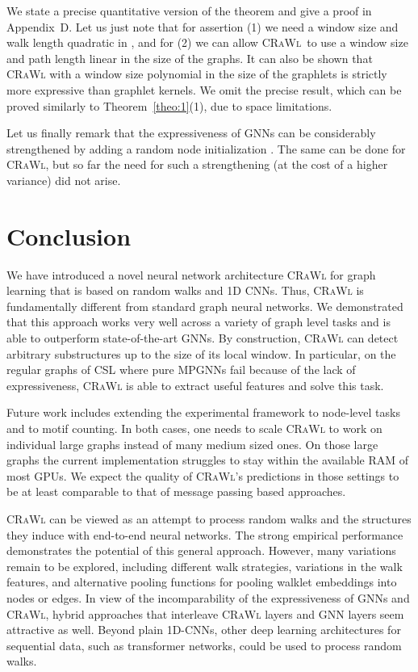 \documentclass{scrartcl} \usepackage[dvipsnames]{xcolor}
\newcommand{\crawl}{\textsc{CRaWl}}
\begin{document}
We state a precise quantitative version of the theorem and give a
proof in Appendix~D. Let us just note that for
{assertion (1)} we need a window size  and walk length 
quadratic in , and for (2) we can allow \crawl\ to use a window
size and path length linear in the size of the graphs.
It can also be shown that
\crawl{} with a window size polynomial in the size of the graphlets is strictly more expressive than graphlet kernels. We omit the precise result, which can be proved similarly to Theorem~\ref{theo:1}(1), due to space
limitations.


Let us finally remark that the expressiveness of GNNs can be
considerably strengthened by adding a random node initialization
\cite{abbceygroluk20,SatoRandom2020}. The same can be done for \crawl{},
but so far the need for such a strengthening (at the cost of a higher
variance) did not arise.



     \section{Conclusion}
\label{conclusion}

We have introduced a novel neural network architecture \crawl{} for graph learning that is based on random walks and 1D CNNs.
Thus, \crawl{} is fundamentally different from standard graph neural networks.
We demonstrated that this approach works very well across a variety of graph level tasks and is able to outperform state-of-the-art GNNs.
By construction, \crawl{} can detect arbitrary substructures up to the size of its local window.
In particular, on the regular graphs of CSL where pure MPGNNs fail because of the lack of expressiveness, \crawl{} is able to extract useful features and solve this task.


Future work includes extending the experimental framework to node-level tasks and to motif counting. 
In both cases, one needs to scale \crawl{} to work on individual large graphs instead of many medium sized ones.
On those large graphs the current implementation struggles to stay within the available RAM of most GPUs.
We expect the quality of \crawl{}'s predictions in those settings to be at least comparable to that of message passing based approaches.




\crawl{} can be viewed as an attempt
to process random walks and the structures they induce with end-to-end neural networks.
The strong empirical performance demonstrates the potential of this general approach.
However, many variations remain to be explored, including different walk strategies, variations in the walk features, and alternative pooling functions for pooling walklet embeddings into nodes or edges. In view of the incomparability of the expressiveness of GNNs and \crawl{}, hybrid approaches that interleave \crawl{} layers and GNN layers seem attractive as well.
Beyond plain 1D-CNNs, other deep learning architectures for sequential data, such as transformer networks, could be used to process random walks.
\end{document}
